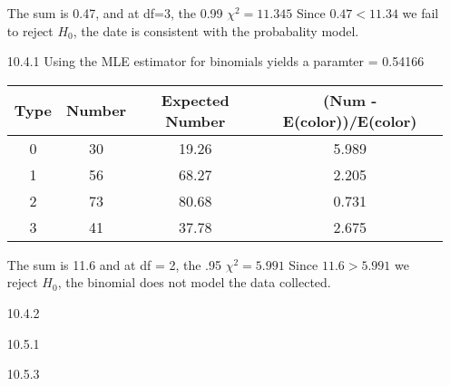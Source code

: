 \documentclass[11pt,fleqn]{article}
\begin{document}
\begin{enumerate}
The sum is 0.47, and at df=3, the 0.99 $\chi^2 = 11.345$ Since $0.47<11.34$ we
fail to reject $H_0$, the date is consistent with the probabality model.  
\item[10.4.1]
Using the MLE estimator for binomials yields a paramter = 0.54166


\begin{tabular}{c c c|c}
Type & Number & Expected Number & (Num - E(color))/E(color) \\
\hline
0 & 30 & 19.26 & 5.989 \\
1 & 56 & 68.27 & 2.205 \\
2 & 73 & 80.68 & 0.731 \\
3 & 41 & 37.78 & 2.675 \\
\hline
\end{tabular}

The sum is 11.6 and at df = 2, the .95  $\chi^2 = 5.991$ Since $11.6 > 5.991$
we reject $H_0$, the binomial does not model the data collected. 
\item[10.4.2]

\item[10.5.1]

\item[10.5.3]
  
\end{enumerate}
\end{document}
